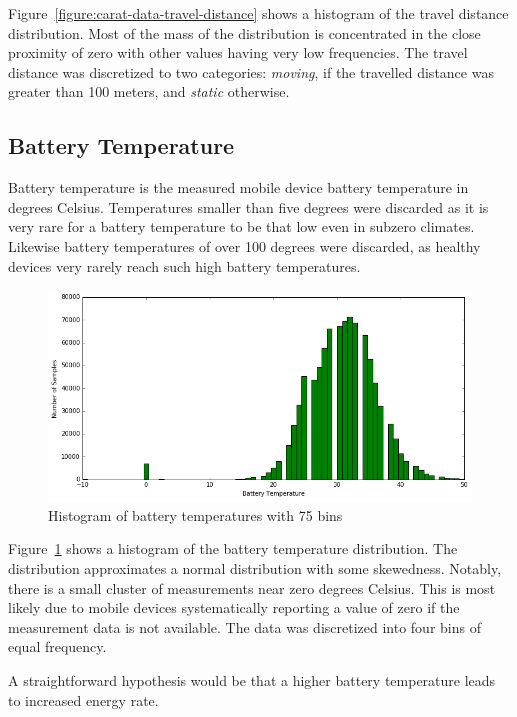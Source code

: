 Figure~\ref{figure:carat-data-travel-distance} shows a histogram of the travel distance distribution. Most of the mass of the distribution is concentrated in the close proximity of zero with other values having very low frequencies. The travel distance was discretized to two categories: \textit{moving}, if the travelled distance was greater than 100 meters, and \textit{static} otherwise.

\subsection{Battery Temperature}  

Battery temperature is the measured mobile device battery temperature in degrees Celsius. Temperatures smaller than five degrees were discarded as it is very rare for a battery temperature to be that low even in subzero climates. Likewise battery temperatures of over 100 degrees were discarded, as healthy devices very rarely reach such high battery temperatures.

\begin{figure} %
	\centering
	\includegraphics[width=\textwidth]{images/carat-data/battery_temperature.png}
	\caption{Histogram of battery temperatures with 75 bins}
	\label{figure:carat-data-battery-temperature}
\end{figure}  

Figure~\ref{figure:carat-data-battery-temperature} shows a histogram of the battery temperature distribution. The distribution approximates a normal distribution with some skewedness. Notably, there is a small cluster of measurements near zero degrees Celsius. This is most likely due to mobile devices systematically reporting a value of zero if the measurement data is not available. The data was discretized into four bins of equal frequency.

A straightforward hypothesis would be that a higher battery temperature leads to increased energy rate.


